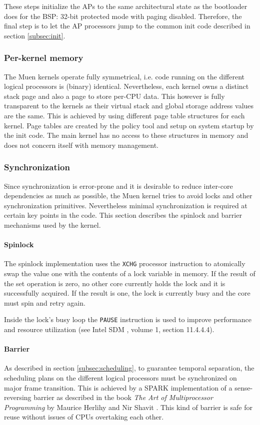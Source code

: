 These steps initialize the APs to the same architectural state as the
bootloader does for the BSP: 32-bit protected mode with paging disabled.
Therefore, the final step is to let the AP processors jump to the common init
code described in section \ref{subsec:init}.

\subsubsection{Per-kernel memory}
The Muen kernels operate fully symmetrical, i.e. code running on the different
logical processors is (binary) identical. Nevertheless, each kernel owns a
distinct stack page and also a page to store per-CPU data. This however is fully
transparent to the kernels as their virtual stack and global storage address
values are the same. This is achieved by using different page table structures
for each kernel. Page tables are created by the policy tool and setup on system
startup by the init code. The main kernel has no access to these structures in
memory and does not concern itself with memory management.

\subsubsection{Synchronization} Since synchronization is error-prone and it is
desirable to reduce inter-core dependencies as much as possible, the Muen
kernel tries to avoid locks and other synchronization primitives. Nevertheless
minimal synchronization is required at certain key points in the code. This
section describes the spinlock and barrier mechanisms used by the kernel.

\paragraph{Spinlock}
The spinlock implementation uses the \texttt{XCHG} processor instruction to
atomically swap the value one with the contents of a lock variable in memory.
If the result of the set operation is zero, no other core currently holds the
lock and it is successfully acquired. If the result is one, the lock is
currently busy and the core must spin and retry again.

Inside the lock's busy loop the \texttt{PAUSE} instruction is used to improve
performance and resource utilization (see Intel SDM \cite{IntelSDM}, volume 1,
section 11.4.4.4).

\paragraph{Barrier}
As described in section \ref{subsec:scheduling}, to guarantee temporal
separation, the scheduling plans on the different logical processors must be
synchronized on major frame transition. This is achieved by a SPARK
implementation of a sense-reversing barrier as described in the book \emph{The
Art of Multiprocessor Programming} by Maurice Herlihy and Nir Shavit
\cite{Herlihy:2008:AMP:1734069}. This kind of barrier is safe for reuse without
issues of CPUs overtaking each other.
